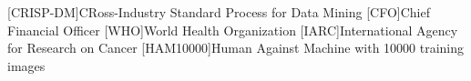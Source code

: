 \begin{acronym}[CRISP-DM]
[CRISP-DM]{CRoss-Industry Standard Process for Data Mining}
[CFO]{Chief Financial Officer}
[WHO]{World Health Organization}
[IARC]{International Agency for Research on Cancer}
[HAM10000]{Human Against Machine with 10000 training images}
\end{acronym}